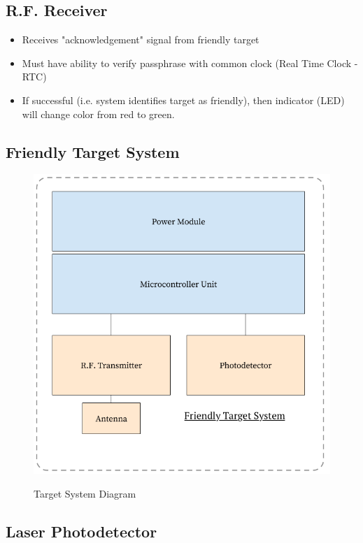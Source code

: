 \documentclass[openbib,letterpaper,10pt]{article}
\begin{document}
\begin{spacing}{1.15}
 \subsection*{{\normalsize  R.F. Receiver}}
\begin{itemize}
	\item Receives "acknowledgement" signal from friendly target
	\item Must have ability to verify passphrase with common clock (Real Time Clock - RTC)
	\item If successful (i.e. system identifies target as friendly), then indicator (LED) will change color from red to green.
\end{itemize}
 
 \subsection*{Friendly Target System}
 
 \begin{figure} [H]
 	\centering
 	\includegraphics[scale=0.35]{Target_Diagram.png}
 	\label{fig:system-diagram}
 	\vspace{-10mm}
 	\caption{Target System Diagram}
 \end{figure}
 
\subsection*{{\normalsize Laser Photodetector}}


\end{spacing}
\end{document}
